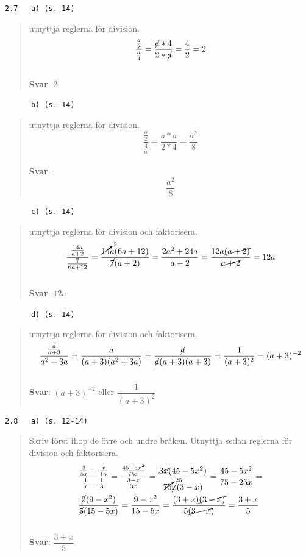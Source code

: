 \documentclass[a4paper]{article}
\newcommand{\tskcol}[1]{\textcolor{tskcol}{#1}}
\begin{document}
	\texttt{\tskcol{2.7~~~a) (s. 14)}}
	\begin{quotation}
		\noindent
		utnyttja reglerna för division.
		\[\dfrac{\frac{a}{2}}{\frac{a}{4}}=
		\dfrac{\cancel{a}*4}{2*\cancel{a}}=
		\dfrac{4}{2}=
		2\]
		\\
		\textbf{Svar}: $2$
	\end{quotation}
	
	\texttt{\tskcol{~~~~~~b) (s. 14)}}
	\begin{quotation}
		\noindent
		utnyttja reglerna för division.
		\[\dfrac{\frac{a}{2}}{\frac{4}{a}}=
		\dfrac{a*a}{2*4}=
		\dfrac{a^2}{8}\]
		\\
		\textbf{Svar}: \[\dfrac{a^2}{8}\]
	\end{quotation}
	
	\texttt{\tskcol{~~~~~~c) (s. 14)}}
	\begin{quotation}
		\noindent
		utnyttja reglerna för division och faktorisera.
		\[\dfrac{\frac{14a}{a+2}}{\frac{7}{6a+12}}=
		\dfrac{\cancelto{2}{14}a(6a+12)}{\cancel{7}(a+2)}=
		\dfrac{2a^2+24a}{a+2}=\dfrac{12a\cancel{(a+2)}}{\cancel{a+2}}=
		12a\]
		\\
		\textbf{Svar}: $12a$
	\end{quotation}
	
	\texttt{\tskcol{~~~~~~d) (s. 14)}}
	\begin{quotation}
		\noindent
		utnyttja reglerna för division och faktorisera.
		\[\dfrac{\frac{a}{a+3}}{a^2+3a}=
		\dfrac{a}{(a+3)(a^2+3a)}=
		\dfrac{\cancel{a}}{\cancel{a}(a+3)(a+3)}=
		\dfrac{1}{(a+3)^2}=
		(a+3)^{-2}\]
		\\
		\textbf{Svar}: $(a+3)^{-2}$ eller $\dfrac{1}{(a+3)^2}$
	\end{quotation}
	
	\texttt{\tskcol{2.8~~~a) (s. 12-14)}}
	\begin{quotation}
		\noindent
		Skriv först ihop de övre och undre bråken. Utnyttja sedan reglerna för division och faktorisera.
		\begin{align*}
		&\dfrac{\frac{3}{5x}-\frac{x}{15}}{\frac{1}{x}-\frac{1}{3}}=
		\dfrac{\frac{45-5x^2}{75x}}{\frac{3-x}{3x}}=
		\dfrac{\cancel{3x}(45-5x^2)}{\cancelto{25}{75}\cancel{x}(3-x)}=
		\dfrac{45-5x^2}{75-25x}= \\
		&\dfrac{\cancel{5}(9-x^2)}{\cancel{5}(15-5x)}=
		\dfrac{9-x^2}{15-5x}=
		\dfrac{(3+x)\cancel{(3-x)}}{5\cancel{(3-x)}}=
		\dfrac{3+x}{5}
		\end{align*}
		\\
		\textbf{Svar}: $\dfrac{3+x}{5}$
	\end{quotation}
	
\end{document}
